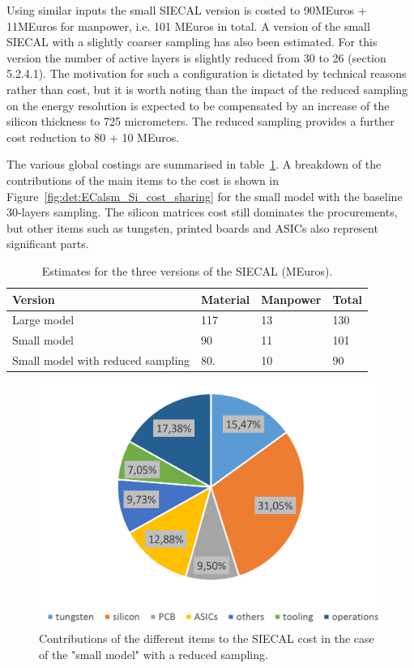 Using similar inputs the small SIECAL version is costed to 90MEuros + 11MEuros for manpower, i.e. 101 MEuros in total. A version of the small SIECAL with a slightly coarser sampling has also been estimated. For this version the number of active layers is slightly reduced from 30 to 26 (section 5.2.4.1). The motivation for such a configuration is dictated by technical reasons rather than cost, but it is worth noting than the impact of the reduced sampling on the energy resolution is expected to be compensated by an increase of the silicon thickness to 725 micrometers. The reduced sampling provides a further cost reduction to 80 + 10 MEuros.  

The various global costings are summarised in table~\ref{ECal_summary}. A breakdown of the contributions of the main items to the cost is shown in Figure~\ref{fig:det:ECalsm_Si_cost_sharing} for the small model with the baseline 30-layers sampling. The silicon matrices cost still dominates the procurements, but other items such as tungsten, printed boards and ASICs also represent significant parts. 

\begin{table}\hspace*{-0cm}\small 
\begin{tabular}[h!]{ l p{0.2\hsize}p{0.2\hsize}p{0.2\hsize} }
\toprule
Version& Material & Manpower & Total \\
\midrule
Large model                       & 117   & 13    & 130   \\
Small model                       & 90    & 11    & 101   \\
Small model with reduced sampling & 80.   & 10    & 90  \\
\bottomrule
\end{tabular}
\caption{\label{ECal_summary}Estimates for the three versions of the SIECAL (MEuros).}
\end{table}

\begin{figure}[h!]
\centering
\includegraphics[width=0.8\hsize]{Costing/ECal26_Si_cost_sharing.PNG}
\caption{Contributions of the different items to the SIECAL cost in the case of the "small model" with a reduced sampling.}
\label{fig:det:ECal26_Si_cost_sharing}
\end{figure}

